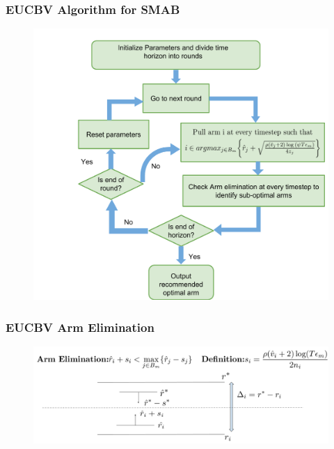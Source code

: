 \begin{frame}
\frametitle{EUCBV Algorithm for SMAB}
\begin{figure}
\includegraphics[scale=0.24]{img/EUCBV_flow.png}
\end{figure}
\end{frame}

\begin{frame}
\frametitle{EUCBV Arm Elimination}
\begin{figure}
\includegraphics[scale=0.24]{img/EUCBV_Arm_Elim.png}
\end{figure}
\end{frame}